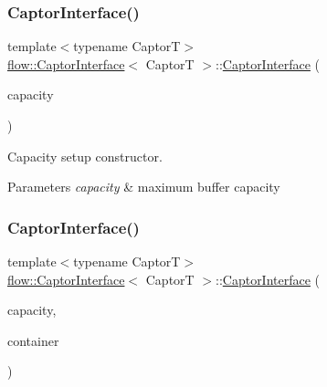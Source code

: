 \subsubsection{\texorpdfstring{Captor\+Interface()}{CaptorInterface()}\hspace{0.1cm}{\footnotesize\ttfamily [1/2]}}
{\footnotesize\ttfamily template$<$typename CaptorT$>$ \\
\hyperlink{classflow_1_1_captor_interface}{flow\+::\+Captor\+Interface}$<$ CaptorT $>$\+::\hyperlink{classflow_1_1_captor_interface}{Captor\+Interface} (\begin{DoxyParamCaption}\item[{const \hyperlink{classflow_1_1_captor_interface_a62db6a158eebcb377e63ede6a1f1a8c6}{size\+\_\+type}}]{capacity }\end{DoxyParamCaption})\hspace{0.3cm}{\ttfamily [explicit]}}



Capacity setup constructor. 


\begin{DoxyParams}{Parameters}
{\em capacity} & maximum buffer capacity \\
\hline
\end{DoxyParams}
\mbox{\label{classflow_1_1_captor_interface_aa94b6265974c0a432a8a2f5fafe35184}} 
\subsubsection{\texorpdfstring{Captor\+Interface()}{CaptorInterface()}\hspace{0.1cm}{\footnotesize\ttfamily [2/2]}}
{\footnotesize\ttfamily template$<$typename CaptorT$>$ \\
\hyperlink{classflow_1_1_captor_interface}{flow\+::\+Captor\+Interface}$<$ CaptorT $>$\+::\hyperlink{classflow_1_1_captor_interface}{Captor\+Interface} (\begin{DoxyParamCaption}\item[{const \hyperlink{classflow_1_1_captor_interface_a62db6a158eebcb377e63ede6a1f1a8c6}{size\+\_\+type}}]{capacity,  }\item[{const \hyperlink{classflow_1_1_captor_interface_a887171bf3b12d8232922a81844ea9a7d}{Dispatch\+Container\+Type} \&}]{container }\end{DoxyParamCaption})\hspace{0.3cm}{\ttfamily [explicit]}}



